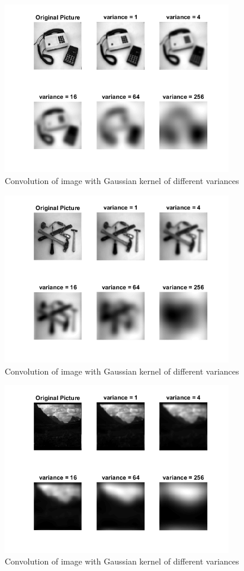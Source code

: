 \documentclass{article}
\begin{document}
\begin{enumerate}
\begin{figure}[H]
        \centering
        \includegraphics[width=10cm]{16blur1.png}
        \caption{Convolution of image with Gaussian kernel of different variances}
        \label{fig2161}
\end{figure}

\begin{figure}[H]
        \centering
        \includegraphics[width=10cm]{16blur2.png}
        \caption{Convolution of image with Gaussian kernel of different variances}
        \label{fig2162}
\end{figure}

\begin{figure}[H]
        \centering
        \includegraphics[width=10cm]{16blur3.png}
        \caption{Convolution of image with Gaussian kernel of different variances}
        \label{fig2163}
\end{figure}


\end{enumerate}
\end{document}
